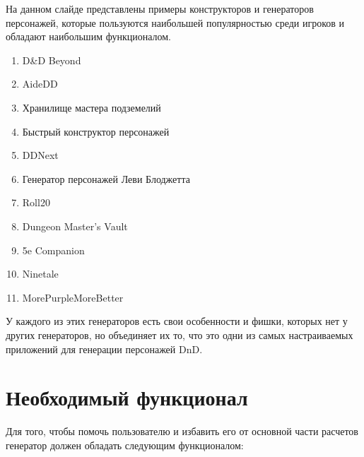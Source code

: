 \documentclass[12pt,a4paper]{article}
\begin{document}
На данном слайде представлены примеры конструкторов и генераторов персонажей, которые пользуются наибольшей популярностью среди игроков и обладают наибольшим функционалом.

\begin{enumerate}
    \item D\&D Beyond

    \item AideDD

    \item Хранилище мастера подземелий

    \item Быстрый конструктор персонажей

    \item DDNext

    \item Генератор персонажей Леви Блоджетта

    \item Roll20

    \item Dungeon Master’s Vault

    \item 5e Companion

    \item Ninetale

    \item MorePurpleMoreBetter
\end{enumerate}

У каждого из этих генераторов есть свои особенности и фишки, которых нет у других генераторов, но объединяет их то, что это одни из самых настраиваемых приложений для генерации персонажей DnD.

\section{Необходимый функционал}

Для того, чтобы помочь пользователю и избавить его от основной части расчетов генератор должен обладать следующим функционалом:
\end{document}
